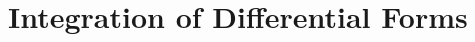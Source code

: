 
\chapter{Integration of Differential Forms}\label{chap:10-integration-of-differential-forms}



















